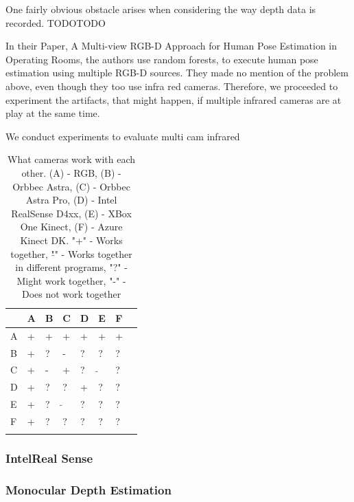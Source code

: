 One fairly obvious obstacle arises when considering the way depth data is recorded. TODOTODO

In their Paper, A Multi-view RGB-D Approach for Human Pose Estimation in Operating Rooms,\cite{MultiSourceOperation} the authors use random forests, to execute human pose estimation using multiple RGB-D sources. They made no mention of the problem above, even though they too use infra red cameras. Therefore, we proceeded to experiment the artifacts, that might happen, if multiple infrared cameras are at play at the same time.

We conduct experiments to evaluate multi cam infrared \cite{NoiseMetrics}
\cite{realsense_multi}
\cite{multi_azure_kin}

\begin{table}[]
\centering
\begin{tabular}{llllllll}
\multicolumn{1}{l|}{}  & A & B & C & D & E & F & \\ \hline
\multicolumn{1}{l|}{A} & + & + & + & + & + & + &  \\
\multicolumn{1}{l|}{B} & + & ? & - & ? & ? & ? &  \\
\multicolumn{1}{l|}{C} & + & - & + & ? & $\tilde{}$ & ? &  \\
\multicolumn{1}{l|}{D} & + & ? & ? & + & ? & ? &  \\
\multicolumn{1}{l|}{E} & + & ? & $\tilde{}$ & ? & ? & ? &  \\
\multicolumn{1}{l|}{F} & + & ? & ? & ? & ? & ? &  \\
                       &   &   &   &   &   &    
\end{tabular}
\caption{What cameras work with each other. (A) - RGB, (B) - Orbbec Astra, (C) - Orbbec Astra  Pro, (D) - Intel RealSense D4xx, (E) - XBox One Kinect, (F) - Azure Kinect DK. "+" - Works together, "$\tilde{}$" - Works together in different programs, "?" - Might work together, "-" - Does not work together}
\label{tab:cross_table}
\end{table}

\subsubsection{IntelReal Sense}






\iffalse

\subsubsection{Monocular Depth Estimation}


